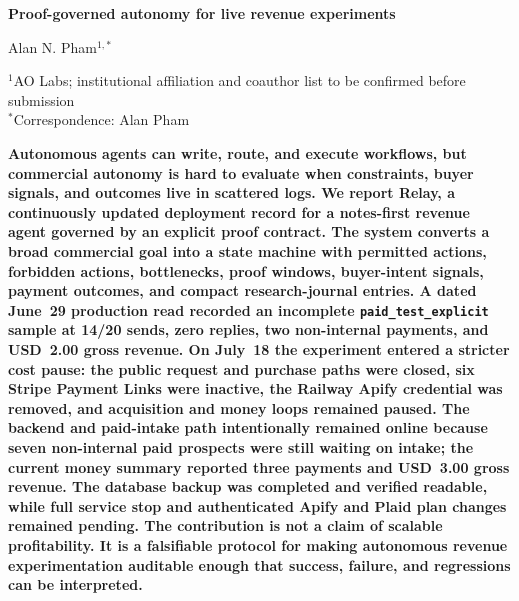 \documentclass[12pt,letterpaper]{article}
\begin{document}
\linenumbers
\thispagestyle{empty}

\begin{center}
    \vspace*{-0.6em}

    {\fontsize{20}{22}\selectfont\bfseries\color{SumiInk}
    Proof-governed autonomy for live revenue experiments\par}

    \vspace{0.95em}

    {\normalsize\color{SumiInk}
    Alan N. Pham$^{1,*}$\par}

    \vspace{0.38em}

    {\small\color{DustyTaupe}
    $^{1}$AO Labs; institutional affiliation and coauthor list to be confirmed before submission\\
    $^{*}$Correspondence: Alan Pham\par}
\end{center}

\vspace{0.35em}
\noindent\textbf{Autonomous agents can write, route, and execute workflows, but commercial autonomy is hard to evaluate when constraints, buyer signals, and outcomes live in scattered logs. We report Relay, a continuously updated deployment record for a notes-first revenue agent governed by an explicit proof contract. The system converts a broad commercial goal into a state machine with permitted actions, forbidden actions, bottlenecks, proof windows, buyer-intent signals, payment outcomes, and compact research-journal entries. A dated June~29 production read recorded an incomplete \texttt{paid\_test\_explicit} sample at 14/20 sends, zero replies, two non-internal payments, and USD~2.00 gross revenue. On July~18 the experiment entered a stricter cost pause: the public request and purchase paths were closed, six Stripe Payment Links were inactive, the Railway Apify credential was removed, and acquisition and money loops remained paused. The backend and paid-intake path intentionally remained online because seven non-internal paid prospects were still waiting on intake; the current money summary reported three payments and USD~3.00 gross revenue. The database backup was completed and verified readable, while full service stop and authenticated Apify and Plaid plan changes remained pending. The contribution is not a claim of scalable profitability. It is a falsifiable protocol for making autonomous revenue experimentation auditable enough that success, failure, and regressions can be interpreted.}
\end{document}
